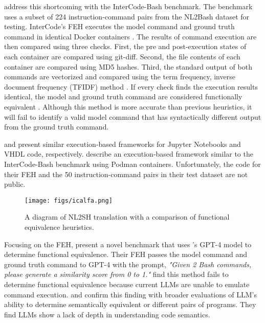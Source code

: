 \citet{InterCode} address this shortcoming with the InterCode-Bash benchmark. The benchmark uses a subset of 224 instruction-command pairs from the NL2Bash dataset for testing. InterCode's FEH executes the model command and ground truth command in identical Docker containers \cite{docker}. The results of command execution are then compared using three checks. First, the pre and post-execution states of each container are compared using git-diff. Second, the file contents of each container are compared using MD5 hashes. Third, the standard output of both commands are vectorized and compared using the term frequency, inverse document frequency (TFIDF) method \cite{tfidf}. If every check finds the execution results identical, the model and ground truth command are considered functionally equivalent \cite{InterCode}. Although this method is more accurate than previous heuristics, it will fail to identify a valid model command that has syntactically different output from the ground truth command.

\citet{ExeDS} and \citet{vhdl} present similar execution-based frameworks for Jupyter Notebooks and VHDL code, respectively. \citet{exec_based_eval} describe an execution-based framework similar to the InterCode-Bash benchmark using Podman containers. Unfortunately, the code for their FEH and the 50 instruction-command pairs in their test dataset are not public.

\begin{figure*}[t!]
  \centering
  \texttt{[image: figs/icalfa.png]}
  \caption{A diagram of NL2SH translation with a comparison of functional equivalence heuristics.}
  \label{fig:icalfa}
\end{figure*}

Focusing on the FEH, \citet{tsed} present a novel benchmark that uses \citeauthor{gpt4}'s GPT-4 model to determine functional equivalence. Their FEH passes the model command and ground truth command to GPT-4 with the prompt, \textit{"Given 2 Bash commands, please generate a similarity score from 0 to 1."} \citet{tsed} find this method fails to determine functional equivalence because current LLMs are unable to emulate command execution. \citet{lackunderstanding} and \citet{limitations} confirm this finding with broader evaluations of LLM's ability to determine semantically equivalent or different pairs of programs. They find LLMs show a lack of depth in understanding code semantics.

